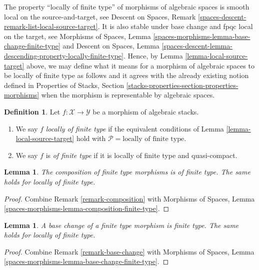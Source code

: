 \documentclass{stacks-project}
\theoremstyle{plain}
\newtheorem{lemma}[subsection]{Lemma}
\theoremstyle{definition}
\newtheorem{definition}[subsection]{Definition}
\theoremstyle{remark}
\numberwithin{equation}{subsection}
\begin{document}
\noindent
The property ``locally of finite type'' of morphisms of algebraic spaces
is smooth local on the source-and-target, see
Descent on Spaces, Remark \ref{spaces-descent-remark-list-local-source-target}.
It is also stable under base change and fpqc local on the target, see
Morphisms of Spaces,
Lemma \ref{spaces-morphisms-lemma-base-change-finite-type}
and
Descent on Spaces,
Lemma \ref{spaces-descent-lemma-descending-property-locally-finite-type}.
Hence, by
Lemma \ref{lemma-local-source-target}
above, we may define what it means for a morphism of algebraic spaces
to be locally of finite type as follows and it agrees with the already
existing notion defined in
Properties of Stacks,
Section \ref{stacks-properties-section-properties-morphisms}
when the morphism is representable by algebraic spaces.

\begin{definition}
\label{definition-locally-finite-type}
Let $f : \mathcal{X} \to \mathcal{Y}$ be a morphism of algebraic stacks.
\begin{enumerate}
\item We say $f$
{\it locally of finite type} if the equivalent conditions of
Lemma \ref{lemma-local-source-target}
hold with
$\mathcal{P} = \text{locally of finite type}$.
\item We say $f$ is
{\it of finite type} if it is locally of finite type and quasi-compact.
\end{enumerate}
\end{definition}

\begin{lemma}
\label{lemma-composition-finite-type}
The composition of finite type morphisms is of finite type.
The same holds for locally of finite type.
\end{lemma}

\begin{proof}
Combine
Remark \ref{remark-composition}
with
Morphisms of Spaces, Lemma \ref{spaces-morphisms-lemma-composition-finite-type}.
\end{proof}

\begin{lemma}
\label{lemma-base-change-finite-type}
A base change of a finite type morphism is finite type.
The same holds for locally of finite type.
\end{lemma}

\begin{proof}
Combine
Remark \ref{remark-base-change}
with
Morphisms of Spaces, Lemma \ref{spaces-morphisms-lemma-base-change-finite-type}.
\end{proof}
\end{document}
